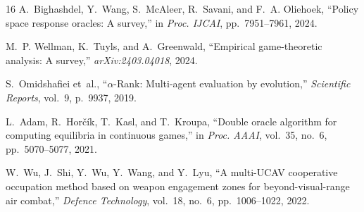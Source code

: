 \documentclass[12pt,a4paper]{article}
\begin{document}
\begin{thebibliography}{16}
A.~Bighashdel, Y.~Wang, S.~McAleer, R.~Savani, and F.~A. Oliehoek,
``Policy space response oracles: A survey,'' in \emph{Proc. IJCAI},
pp.~7951--7961, 2024.

M.~P. Wellman, K.~Tuyls, and A.~Greenwald, ``Empirical game-theoretic
analysis: A survey,'' \emph{arXiv:2403.04018}, 2024.

S.~Omidshafiei et~al., ``$\alpha$-Rank: Multi-agent evaluation by
evolution,'' \emph{Scientific Reports}, vol.~9, p.~9937, 2019.

L.~Adam, R.~Hor{\v{c}}{\'i}k, T.~Kasl, and T.~Kroupa, ``Double oracle
algorithm for computing equilibria in continuous games,'' in \emph{Proc.
AAAI}, vol.~35, no.~6, pp.~5070--5077, 2021.

W.~Wu, J.~Shi, Y.~Wu, Y.~Wang, and Y.~Lyu, ``A multi-UCAV cooperative
occupation method based on weapon engagement zones for beyond-visual-range
air combat,'' \emph{Defence Technology}, vol.~18, no.~6, pp.~1006--1022,
2022.

\end{thebibliography}
\end{document}
